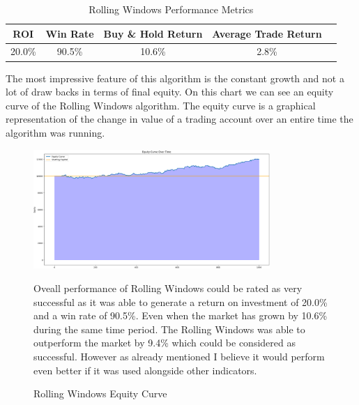 \documentclass{imc-inf}
\begin{document}
	
	\begin{table}[h!]
		\centering
		\begin{tabular}{|c|c|c|c|c|}
			\hline
			\textbf{ROI} & \textbf{Win Rate} & \textbf{Buy \& Hold Return} & \textbf{Average Trade Return} \\ \hline
			20.0\%         & 90.5\%               & 10.6\%                         & 2.8\%                           \\ \hline
		\end{tabular}
		\caption{Rolling Windows Performance Metrics}
		\label{tab:rolling_windows_performance_metrics}
	\end{table}
	The most impressive feature of this algorithm is the constant growth and not a lot of draw backs in terms of final equity.
	On this chart we can see an equity curve of the Rolling Windows algorithm. The equity curve is a graphical representation of the change in value of a trading account over an entire
	time the algorithm was running.
	\begin{figure}[h!]
		\centering
		\includegraphics[width=0.8\textwidth]{rolling_windows_equity_curve.png}
		\caption{Rolling Windows Equity Curve}
		\label{fig:rolling_windows_equity_curve}
		Oveall performance of Rolling Windows could be rated as very successful as it was able to generate a return on investment of 20.0\% and a win rate of 90.5\%. 
		Even when the market has grown by 10.6\% during the same time period. The Rolling Windows was able to outperform the market by 9.4\% which could be considered as successful.
		However as already mentioned I believe it would perform even better if it was used alongside other indicators.
	\end{figure}
	
\end{document}
